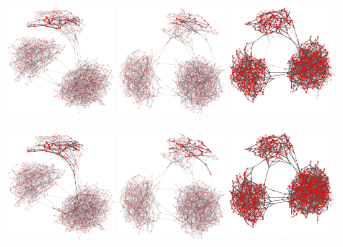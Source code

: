 \begin{figure}
\includegraphics[width=0.25\textwidth]{batchRun__kHalf=2-2-2_maxUpdate=0.02_noize=0_nbrDepth=1/network500-crop.pdf}
\hfill
\includegraphics[width=0.25\textwidth]{batchRun__kHalf=2-2-2_maxUpdate=0.02_noize=0.01_nbrDepth=1/network500-crop.pdf}
\hfill
\includegraphics[width=0.25\textwidth]{batchRun__kHalf=2-2-2_maxUpdate=0.02_noize=0.1_nbrDepth=1/network500-crop.pdf}


\includegraphics[width=0.25\textwidth]{batchRun__kHalf=2-2-2_maxUpdate=0.02_noize=0_nbrDepth=1/network750-crop.pdf}
\hfill
\includegraphics[width=0.25\textwidth]{batchRun__kHalf=2-2-2_maxUpdate=0.02_noize=0.01_nbrDepth=1/network750-crop.pdf}
\hfill
\includegraphics[width=0.25\textwidth]{batchRun__kHalf=2-2-2_maxUpdate=0.02_noize=0.1_nbrDepth=1/network750-crop.pdf}


\end{figure}
